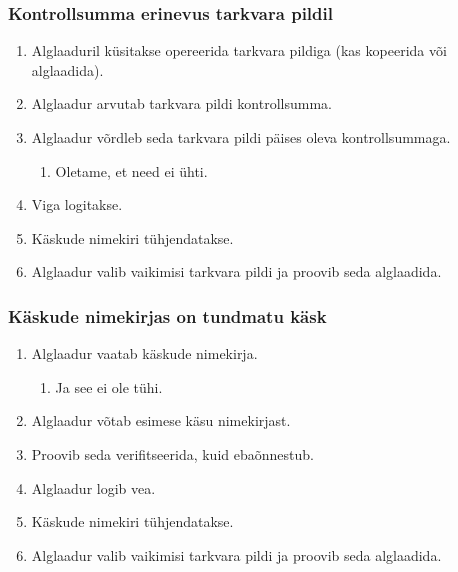 \documentclass[12pt,a4paper]{article}
\begin{document}
\subsubsection{Kontrollsumma erinevus tarkvara pildil}
\begin{enumerate}
	\item Alglaaduril küsitakse opereerida tarkvara pildiga (kas kopeerida või
		alglaadida).
	\item Alglaadur arvutab tarkvara pildi kontrollsumma.
	\item Alglaadur võrdleb seda tarkvara pildi päises oleva kontrollsummaga.
		\begin{enumerate}
			\item Oletame, et need ei ühti.
		\end{enumerate}
	\item Viga logitakse.
	\item Käskude nimekiri tühjendatakse.
	\item Alglaadur valib vaikimisi tarkvara pildi ja proovib seda alglaadida.
\end{enumerate}

\subsubsection{Käskude nimekirjas on tundmatu käsk}
\begin{enumerate}
	\item Alglaadur vaatab käskude nimekirja.
		\begin{enumerate}
			\item Ja see ei ole tühi.
		\end{enumerate}
	\item Alglaadur võtab esimese käsu nimekirjast.
	\item Proovib seda verifitseerida, kuid ebaõnnestub.
	\item Alglaadur logib vea.
	\item Käskude nimekiri tühjendatakse.
	\item Alglaadur valib vaikimisi tarkvara pildi ja proovib seda alglaadida.
\end{enumerate}
\end{document}
